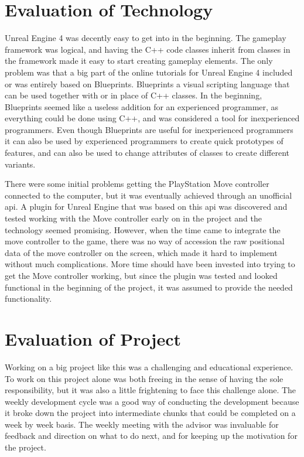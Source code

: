 	
\section{Evaluation of Technology}
Unreal Engine 4 was decently easy to get into in the beginning. The gameplay framework was logical, and having the C++ code classes inherit from classes in the framework made it easy to start creating gameplay elements. The only problem was that a big part of the online tutorials for Unreal Engine 4 included or was entirely based on Blueprints. Blueprints a visual scripting language that can be used together with or in place of C++ classes. In the beginning, Blueprints seemed like a useless addition for an experienced programmer, as everything could be done using C++, and was considered a tool for inexperienced programmers. Even though Blueprints are useful for inexperienced programmers it can also be used by experienced programmers to create quick prototypes of features, and can also be used to change attributes of classes to create different variants.

There were some initial problems getting the PlayStation Move controller connected to the computer, but it was eventually achieved through an unofficial \gls{api}. A plugin for Unreal Engine that was based on this \gls{api} was discovered and tested working with the Move controller early on in the project and the technology seemed promising. However, when the time came to integrate the move controller to the game, there was no way of accession the raw positional data of the move controller on the screen, which made it hard to implement without much complications. More time should have been invested into trying to get the Move controller working, but since the plugin was tested and looked functional in the beginning of the project, it was assumed to provide the needed functionality.


\section{Evaluation of Project}
Working on a big project like this was a challenging and educational experience. To work on this project alone was both freeing in the sense of having the sole responsibility, but it was also a little frightening to face this challenge alone. The weekly development cycle was a good way of conducting the development because it broke down the project into intermediate chunks that could be completed on a week by week basis. The weekly meeting with the advisor was invaluable for feedback and direction on what to do next, and for keeping up the motivation for the project.

